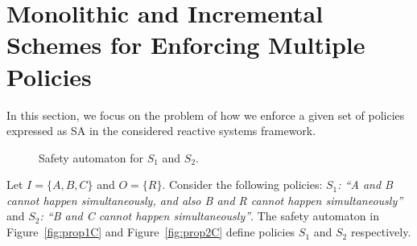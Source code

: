 \section{Monolithic and Incremental Schemes for Enforcing Multiple Policies}
\label{sec:composition}

In this section, we focus on the problem of how we enforce a given set of policies expressed as SA in the considered reactive systems framework.
\begin{figure}
	\centering
	\centering
	\hspace{0.1em}
	\caption{Safety automaton for $S_1$ and $S_2$.}
	\label{fig:prop1&2}
\end{figure}
\begin{example}
	\label{eg:propC}
	Let $I= \{A,B,C\}$ and $O = \{R\}$.
	Consider the following policies: \textit{$S_1$: ``A and B cannot happen simultaneously, and also B and R cannot happen simultaneously''} and \textit{$S_2$: ``B and C cannot happen simultaneously''}.
	The safety automaton in Figure~\ref{fig:prop1C} and Figure~\ref{fig:prop2C} define policies $S_1$ and $S_2$ respectively.
\end{example}
%
